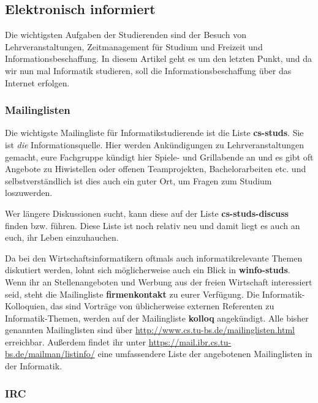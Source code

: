 \label{elekinf}\subsection{Elektronisch informiert}

Die wichtigsten Aufgaben der Studierenden sind der Besuch von Lehrveranstaltungen, Zeitmanagement für Studium und Freizeit und Informationsbeschaffung. In diesem Artikel geht es um den letzten Punkt, und da wir nun mal Informatik studieren, soll die Informationsbeschaffung über das Internet erfolgen.


\subsubsection*{Mailinglisten}

Die wichtigste Mailingliste für Informatikstudierende ist die Liste \textbf{cs-studs}. Sie ist \emph{die} Informationsquelle. Hier werden Ankündigungen zu Lehrveranstaltungen gemacht, eure Fachgruppe kündigt hier Spiele- und Grillabende an und es gibt oft Angebote zu Hiwistellen oder offenen Teamprojekten, Bachelorarbeiten etc. und selbstverständlich ist dies auch ein guter Ort, um Fragen zum Studium loszuwerden.

Wer längere Diskussionen sucht, kann diese auf der Liste \textbf{cs-studs-discuss} finden bzw. führen. Diese Liste ist noch relativ neu und damit liegt es auch an euch, ihr Leben einzuhauchen.

Da bei den Wirtschaftsinformatikern oftmals auch informatikrelevante Themen diskutiert werden, lohnt sich möglicherweise auch ein Blick in \textbf{winfo-studs}. Wenn ihr an Stellenangeboten und Werbung aus der freien Wirtschaft interessiert seid, steht die Mailingliste \textbf{firmenkontakt} zu eurer Verfügung. Die Informatik-Kolloquien, das sind Vorträge von üblicherweise externen Referenten zu Informatik-Themen, werden auf der Mailingliste \textbf{kolloq} angekündigt. Alle bisher genannten Mailinglisten sind über \url{http://www.cs.tu-bs.de/mailinglisten.html} erreichbar. Außerdem findet ihr unter \url{https://mail.ibr.cs.tu-bs.de/mailman/listinfo/} eine umfassendere Liste der angebotenen Mailinglisten in der Informatik.

\subsubsection*{IRC}

